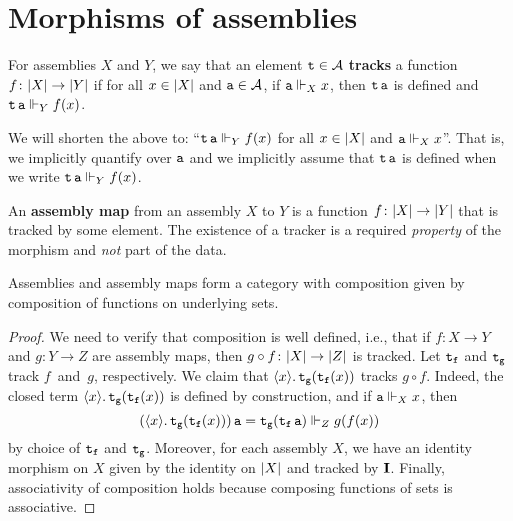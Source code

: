 \section{Morphisms of assemblies}

\begin{definition}[Track]
  For assemblies \(X\) and \(Y\), we say that an element \(\operatorname{\mathtt{t}} \in \mathcal A\)
  \textbf{tracks} a function \(f \colon \lvert X\rvert \to \lvert Y\rvert\) if for all
  \(x \in \lvert X\rvert\) and \(\operatorname{\mathtt{a}} \in \mathcal A\), if \(\operatorname{\mathtt{a}} \Vdash_X x\), then
  \(\operatorname{\mathtt{t}}\operatorname{\mathtt{a}}\) is defined and \(\operatorname{\mathtt{t}}\operatorname{\mathtt{a}} \Vdash_Y f(x)\).
\end{definition}

\begin{notation}
  We will shorten the above to: ``\(\operatorname{\mathtt{t}}\operatorname{\mathtt{a}} \Vdash_Y f(x)\)
  for all \(x \in \lvert X\rvert\) and \(\operatorname{\mathtt{a}} \Vdash_X x\)''.
  That is, we implicitly quantify over \(\operatorname{\mathtt{a}}\) and we implicitly assume that
  \(\operatorname{\mathtt{t}}\operatorname{\mathtt{a}}\) is defined when we write
  \(\operatorname{\mathtt{t}}\operatorname{\mathtt{a}} \Vdash_Y f(x)\).
\end{notation}

\begin{definition}
  An \textbf{assembly map} from an assembly \(X\) to \(Y\) is a function
  \(f \colon \lvert X\rvert \to \lvert Y\rvert\) that is tracked by some element.
  The existence of a tracker is a required \emph{property} of the morphism and
  \emph{not} part of the data.
\end{definition}

\begin{proposition}
  Assemblies and assembly maps form a category with composition given
  by composition of functions on underlying sets.
\end{proposition}
\begin{proof}
  We need to verify that composition is well defined, i.e., that if
  \(f \colon X \to Y\) and \(g \colon Y \to Z\) are assembly maps, then
  \(g \circ f \colon \lvert X\rvert \to \lvert Z\rvert\) is tracked.
  Let \(\operatorname{\mathtt{t_f}}\) and \(\operatorname{\mathtt{t_g}}\) track \(f\)~and~\(g\), respectively.  We
  claim that \(\langle{{x}}\rangle.\,{\operatorname{\mathtt{t_g}}(\operatorname{\mathtt{t_f}}(x))}\) tracks \(g \circ
  f\). Indeed, the closed term \(\langle{{x}}\rangle.\,{\operatorname{\mathtt{t_g}}(\operatorname{\mathtt{t_f}}(x))}\) is
  defined by construction, and if \(\operatorname{\mathtt{a}} \Vdash_X x\), then
  \[
    {(\langle{{x}}\rangle.\,{\operatorname{\mathtt{t_g}}(\operatorname{\mathtt{t_f}}(x)}))\operatorname{\mathtt{a}} =
    \operatorname{\mathtt{t_g}}(\operatorname{\mathtt{t_f}}\operatorname{\mathtt{a}})} \Vdash_Z g(f(x))
  \]
  by choice of \(\operatorname{\mathtt{t_f}}\) and \(\operatorname{\mathtt{t_g}}\).
  Moreover, for each assembly \(X\), we have an identity morphism on \(X\) given
  by the identity on \(\lvert X\rvert\) and tracked by \(\operatorname{\mathbf{I}}\).
  Finally, associativity of composition holds because composing functions of
  sets is associative.
\end{proof}

